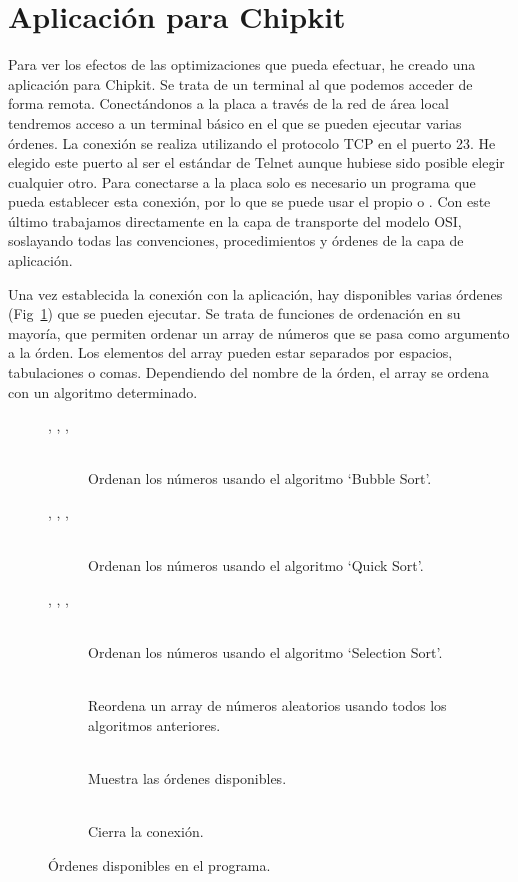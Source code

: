 \section{Aplicación para Chipkit}

Para ver los efectos de las optimizaciones que  pueda efectuar, he creado una aplicación para Chipkit. Se trata de un terminal al que podemos acceder de forma remota. Conectándonos a la placa a través de la red de área local tendremos acceso a un terminal básico en el que se pueden ejecutar varias órdenes. La conexión se realiza utilizando el protocolo TCP en el puerto 23. He elegido este puerto al ser el estándar de Telnet aunque hubiese sido posible elegir cualquier otro. Para conectarse a la placa solo es necesario un programa que pueda establecer esta conexión, por lo que se puede usar el propio  o . Con este último trabajamos directamente en la capa de transporte del modelo OSI, soslayando todas las convenciones, procedimientos y órdenes de la capa de aplicación.

Una vez establecida la conexión con la aplicación, hay disponibles varias órdenes (Fig~\ref{sorted_ordenes}) que se pueden ejecutar. Se trata de funciones de ordenación en su mayoría, que permiten ordenar un array de números que se pasa como argumento a la órden. Los elementos del array pueden estar separados por espacios, tabulaciones o comas. Dependiendo del nombre de la órden, el array se ordena con un algoritmo determinado.

\begin{figure}[htb]
\begin{description}
	\item[, , , ] \hfill \\
	 Ordenan los números usando el algoritmo `Bubble Sort'.
	\item[, , , ] \hfill \\
	 Ordenan los números usando el algoritmo `Quick Sort'.
	\item[, , , ] \hfill \\
	 Ordenan los números usando el algoritmo `Selection Sort'.
	\item[] \hfill \\
	 Reordena un array de números aleatorios usando todos los algoritmos anteriores.
	\item[] \hfill \\
	 Muestra las órdenes disponibles.
	\item[] \hfill \\
	 Cierra la conexión.
\end{description}
\caption{Órdenes disponibles en el programa.}
\label{sorted_ordenes}
\end{figure}

